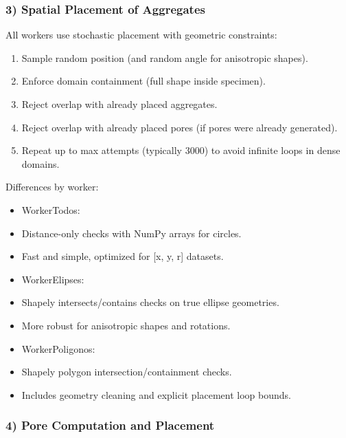 ﻿\documentclass[11pt,a4paper]{article}
\begin{document}
\subsubsection*{3) Spatial Placement of Aggregates}

All workers use stochastic placement with geometric constraints:


\begin{enumerate}
\item Sample random position (and random angle for anisotropic shapes).
\item Enforce domain containment (full shape inside specimen).
\item Reject overlap with already placed aggregates.
\item Reject overlap with already placed pores (if pores were already generated).
\item Repeat up to max attempts (typically 3000) to avoid infinite loops in dense domains.
\end{enumerate}

Differences by worker:


\begin{itemize}
\item WorkerTodos:
\item Distance-only checks with NumPy arrays for circles.
\item Fast and simple, optimized for [x, y, r] datasets.
\end{itemize}

\begin{itemize}
\item WorkerElipses:
\item Shapely intersects/contains checks on true ellipse geometries.
\item More robust for anisotropic shapes and rotations.
\end{itemize}

\begin{itemize}
\item WorkerPoligonos:
\item Shapely polygon intersection/containment checks.
\item Includes geometry cleaning and explicit placement loop bounds.
\end{itemize}

\subsubsection*{4) Pore Computation and Placement}
\end{document}
